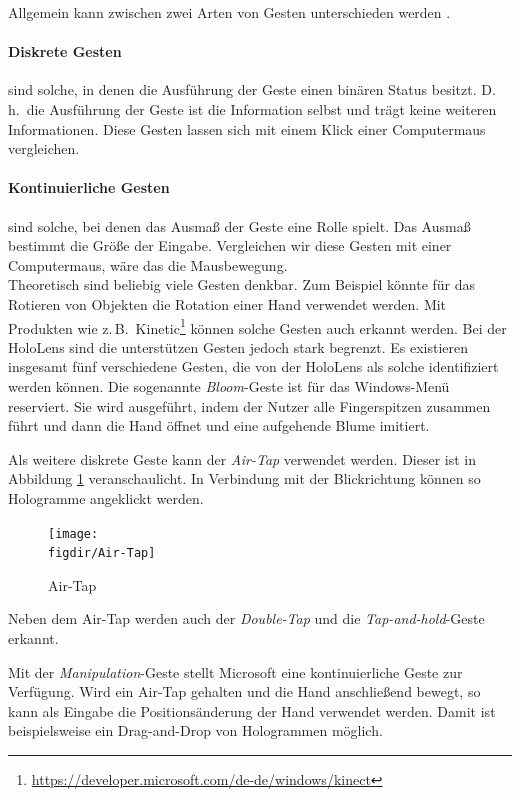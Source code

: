 Allgemein kann zwischen zwei Arten von Gesten unterschieden werden \cite{windows2017gesture}.

\paragraph{Diskrete Gesten} sind solche, in denen die Ausführung der Geste einen binären Status besitzt. D.\,h.\ die Ausführung der Geste ist die Information selbst und trägt keine weiteren Informationen. Diese Gesten lassen sich mit einem Klick einer Computermaus vergleichen.

\paragraph{Kontinuierliche Gesten} sind solche, bei denen das Ausmaß der Geste eine Rolle spielt. Das Ausmaß bestimmt die Größe der Eingabe. Vergleichen wir diese Gesten mit einer Computermaus, wäre das die Mausbewegung.\\

Theoretisch sind beliebig viele Gesten denkbar. Zum Beispiel könnte für das Rotieren von Objekten die Rotation einer Hand verwendet werden. Mit Produkten wie z.\,B.\ Kinetic\footnote{\url{https://developer.microsoft.com/de-de/windows/kinect}} können solche Gesten auch erkannt werden. Bei der HoloLens sind die unterstützen Gesten jedoch stark begrenzt. Es existieren insgesamt fünf verschiedene Gesten, die von der HoloLens als solche identifiziert werden können. Die sogenannte \textit{Bloom}-Geste ist für das Windows-Menü reserviert. Sie wird ausgeführt, indem der Nutzer alle Fingerspitzen zusammen führt und dann die Hand öffnet und eine aufgehende Blume imitiert.

Als weitere diskrete Geste kann der \textit{Air-Tap} verwendet werden. Dieser ist in Abbildung \ref{fig:Air-Tap} veranschaulicht. In Verbindung mit der Blickrichtung können so Hologramme angeklickt werden.

\begin{figure}[htb]
  \texttt{[image: \\figdir/Air-Tap]}
  \caption{Air-Tap \cite{windows2017gesture}}
  \label{fig:Air-Tap}
\end{figure}

Neben dem Air-Tap werden auch der \textit{Double-Tap} und die \textit{Tap-and-hold}-Geste erkannt.

Mit der \textit{Manipulation}-Geste stellt Microsoft eine kontinuierliche Geste zur Verfügung. Wird ein Air-Tap gehalten und die Hand anschließend bewegt, so kann als Eingabe die Positionsänderung der Hand verwendet werden. Damit ist beispielsweise ein Drag-and-Drop von Hologrammen möglich.

